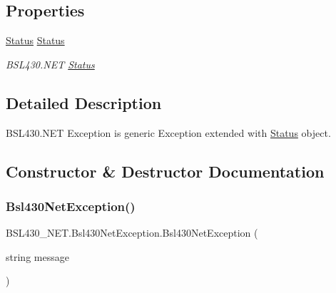 \subsection*{Properties}
\begin{DoxyCompactItemize}
\item 
\mbox{\hyperlink{class_b_s_l430___n_e_t_1_1_status}{Status}} \mbox{\hyperlink{class_b_s_l430___n_e_t_1_1_bsl430_net_exception_a9252354e812bcd9fc4d537c74335b4a1}{Status}}
\begin{DoxyCompactList}\small\item\em B\+S\+L430.\+N\+ET \mbox{\hyperlink{class_b_s_l430___n_e_t_1_1_status}{Status}} \end{DoxyCompactList}\end{DoxyCompactItemize}


\subsection{Detailed Description}
B\+S\+L430.\+N\+ET Exception is generic Exception extended with \mbox{\hyperlink{class_b_s_l430___n_e_t_1_1_status}{Status}} object. 



\subsection{Constructor \& Destructor Documentation}
\mbox{\label{class_b_s_l430___n_e_t_1_1_bsl430_net_exception_a2ac11a751f784f83d83986174b27621f}} 
\subsubsection{\texorpdfstring{Bsl430NetException()}{Bsl430NetException()}\hspace{0.1cm}{\footnotesize\ttfamily [1/5]}}
{\footnotesize\ttfamily B\+S\+L430\+\_\+\+N\+E\+T.\+Bsl430\+Net\+Exception.\+Bsl430\+Net\+Exception (\begin{DoxyParamCaption}\item[{string}]{message }\end{DoxyParamCaption})}



